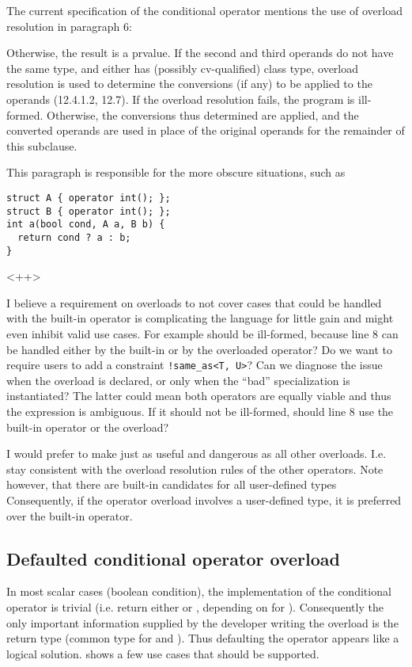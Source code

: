 The current specification of the conditional operator \cite[{[expr.cond]}]{N4842} mentions the use of overload resolution in paragraph 6:
\begin{wgText}
\setcounter{Paras}{5}\pnum
Otherwise, the result is a prvalue.
If the second and third operands do not have the same type, and either has (possibly cv-qualified) class type, overload resolution is used to determine the conversions (if any) to be applied to the operands (12.4.1.2, 12.7).
If the overload resolution fails, the program is ill-formed.
Otherwise, the conversions thus determined are applied, and the converted operands are used in place of the original operands for the remainder of this subclause.
\end{wgText}
This paragraph is responsible for the more obscure situations, such as
\medskip\begin{lstlisting}[style=Vc]
struct A { operator int(); };
struct B { operator int(); };
int a(bool cond, A a, B b) {
  return cond ? a : b;
}
\end{lstlisting}
<++>

I believe a requirement on  overloads to not cover cases that could be handled with the built-in operator is complicating the language for little gain and might even inhibit valid use cases.
For example should  be ill-formed, because line 8 can be handled either by the built-in or by the overloaded operator?
Do we want to require users to add a constraint \lstinline[style=Vc]@!same_as<T, U>@?
Can we diagnose the issue when the overload is declared, or only when the “bad” specialization is instantiated?
The latter could mean both operators are equally viable and thus the expression is ambiguous.
If it should not be ill-formed, should line 8 use the built-in operator or the overload?

I would prefer to make  just as useful and dangerous as all other overloads.
I.e. stay consistent with the overload resolution rules of the other operators.
Note however, that there are built-in candidates for all user-defined types 
Consequently, if the operator overload involves a user-defined type, it is preferred over the built-in operator.

\subsection{Defaulted conditional operator overload}
In most scalar cases (boolean condition), the implementation of the conditional operator is trivial (i.e. return either  or , depending on  for ).
Consequently the only important information supplied by the developer writing the overload is the return type (common type for  and ).
Thus defaulting the operator appears like a logical solution.
 shows a few use cases that should be supported.

